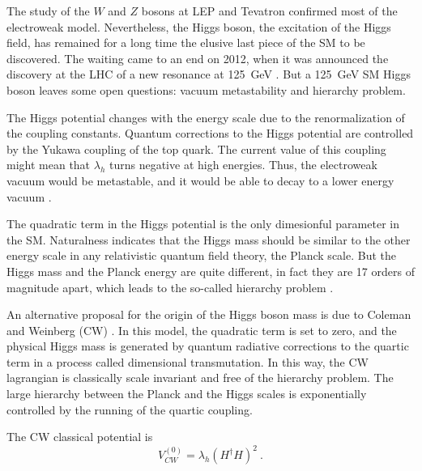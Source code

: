 \documentclass[aps,prd,preprintnumbers,nofootinbibn,twocolumn]{revtex4}
\begin{document}
The study of the $W$ and $Z$ bosons at LEP and Tevatron confirmed most of the electroweak model. Nevertheless, the Higgs boson, the excitation of the Higgs field, has remained for a long time the elusive last piece of the SM to be discovered. The waiting came to an end on 2012, when it was announced the discovery at the LHC  of a new resonance at \SI{125}{\giga\electronvolt} \cite{Aad:2012tfa,Chatrchyan:2012xdj}. But a \SI{125}{\giga\electronvolt} SM Higgs boson leaves some open questions: vacuum metastability and hierarchy problem.
 
The Higgs potential changes with the energy scale due to the renormalization of the coupling constants. Quantum corrections to the Higgs potential are controlled by the Yukawa coupling of the top quark. The current value of this coupling might mean that $\lambda_h$ turns negative at high energies. Thus, the electroweak vacuum would be metastable, and it would be able to decay to a lower energy vacuum \cite{EliasMiro:2011aa}.

The quadratic term in the Higgs potential is the only dimesionful parameter in the SM. Naturalness indicates that the Higgs mass should be similar to the other energy scale in any relativistic quantum field theory, the Planck scale. But the Higgs mass and the Planck energy are quite different, in fact they are 17 orders of magnitude apart, which leads to the so-called hierarchy problem \cite{Iso:2013aqa}. 

An alternative proposal for the origin of the Higgs boson mass is due to Coleman and Weinberg (CW) \cite{Coleman:1973jx}. In this model, the quadratic term is set to zero, and the physical Higgs mass is generated by quantum radiative corrections to the quartic term in a process called dimensional transmutation. In this way, the CW lagrangian is classically scale invariant and free of the hierarchy problem. The large hierarchy between the Planck and the Higgs scales is exponentially controlled by the running of the quartic coupling. 

The CW classical potential is
\begin{equation}
V_{CW}^{(0)} = \lambda_h (H^\dagger H)^2\ .
\end{equation}
\end{document}
